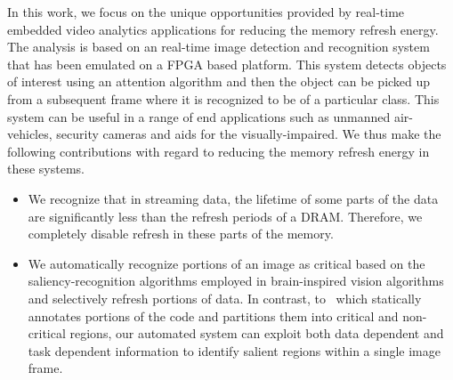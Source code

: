 In this work, we focus on the unique opportunities provided by real-time embedded video analytics applications for reducing the memory refresh energy. The analysis is based on an real-time image detection and recognition system that has been emulated on a FPGA based platform. This system detects objects of interest using an attention algorithm and then the object can be picked up from a subsequent frame where it is recognized to be of a particular class. 
This system can be useful in a range of end applications such as unmanned air-vehicles, security cameras and aids for the visually-impaired. We thus make the following contributions with regard to reducing the memory refresh energy in these systems.

\begin{itemize}[leftmargin=*]
\item We recognize that in streaming data, the lifetime of some parts of the data are significantly less than the refresh periods of a DRAM. Therefore, we completely disable refresh in these parts of the memory. 
\item We automatically recognize portions of an image as critical based on the saliency-recognition algorithms employed in brain-inspired vision algorithms and selectively refresh portions of data.
In contrast, to~\cite{Liu2011} which statically annotates portions of the code and partitions them into critical and non-critical regions, our automated system can exploit both data dependent and task dependent information to identify salient regions within a single image frame. 

\end{itemize}
